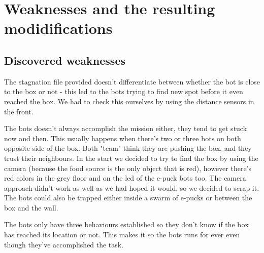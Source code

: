 \documentclass[12pt, a4paper]{article}
\begin{document}
\section{Weaknesses and the resulting modidifications}
\subsection{Discovered weaknesses}

The stagnation file provided doesn't differentiate between whether the bot is close to the box or not - this led to the bots trying to find new spot before it even reached the box. We had to check this ourselves by using the distance sensors in the front. 

The bots doesn't always accomplish the mission either, they tend to get stuck now and then. This usually happens when there's two or three bots on both opposite side of the box. Both "team" think they are pushing the box, and they trust their neighbours. 
In the start we decided to try to find the box by using the camera (because the food source is the only object that is red), however there's red colors in the grey floor and on the led of the e-puck bots too. The camera approach didn't work as well as we had hoped it would, so we decided to scrap it.
The bots could also be trapped either inside a swarm of e-pucks or between the box and the wall.

The bots only have three behaviours established so they don't know if the box has reached its location or not. This makes it so the bots runs for ever even though they've accomplished the task.
\end{document}
